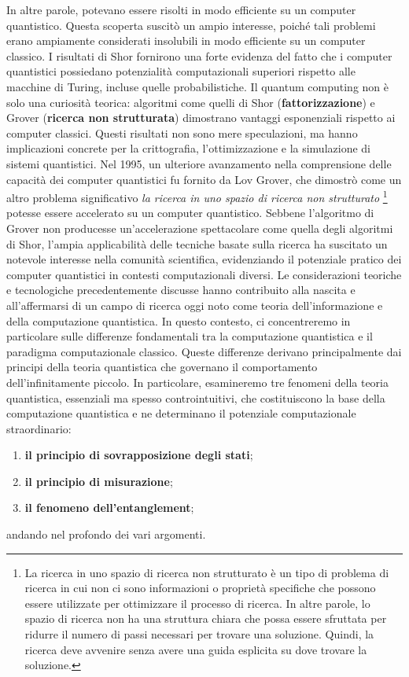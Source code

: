 \documentclass[a4paper,12pt]{report}
\theoremstyle{plain}
\begin{document}
In altre parole, potevano essere risolti in modo efficiente su un computer quantistico. Questa scoperta suscitò un ampio interesse, poiché tali problemi erano ampiamente considerati insolubili in modo efficiente su un computer classico. 
I risultati di Shor fornirono una forte evidenza del fatto che i computer quantistici possiedano potenzialità computazionali superiori rispetto alle macchine di Turing, incluse quelle probabilistiche. Il quantum computing non è solo una curiosità teorica: algoritmi come quelli di Shor (\textbf{fattorizzazione}) e Grover (\textbf{ricerca non strutturata}) dimostrano vantaggi esponenziali rispetto ai computer classici. 
Questi risultati non sono mere speculazioni, ma hanno implicazioni concrete per la crittografia, l'ottimizzazione e la simulazione di sistemi quantistici. 
Nel 1995, un ulteriore avanzamento nella comprensione delle capacità dei computer quantistici fu fornito da Lov Grover, che dimostrò come un altro problema significativo \textit{la ricerca in uno spazio di ricerca non strutturato} \footnote{La ricerca in uno spazio di ricerca non strutturato è un tipo di problema di ricerca in cui non ci sono informazioni o proprietà specifiche che possono essere utilizzate per ottimizzare il processo di ricerca. In altre parole, lo spazio di ricerca non ha una struttura chiara che possa essere sfruttata per ridurre il numero di passi necessari per trovare una soluzione. Quindi, la ricerca deve avvenire senza avere una guida esplicita su dove trovare la soluzione.} potesse essere accelerato su un computer quantistico. 
Sebbene l'algoritmo di Grover non producesse un'accelerazione spettacolare come quella degli algoritmi di Shor, l'ampia applicabilità delle tecniche basate sulla ricerca ha suscitato un notevole interesse nella comunità scientifica, evidenziando il potenziale pratico dei computer quantistici in contesti computazionali diversi. Le considerazioni teoriche e tecnologiche precedentemente discusse hanno contribuito alla nascita e all'affermarsi di un campo di ricerca oggi noto come teoria dell'informazione e della computazione quantistica. In questo contesto, ci concentreremo in particolare sulle differenze fondamentali tra la computazione quantistica e il paradigma computazionale classico. 
\newpage
\noindent Queste differenze derivano principalmente dai principi della teoria quantistica che governano il comportamento dell'infinitamente piccolo. In particolare, esamineremo tre fenomeni della teoria quantistica, essenziali ma spesso controintuitivi, che costituiscono la base della computazione quantistica e ne determinano il potenziale computazionale straordinario: 
\begin{enumerate}
  \item \textbf{il principio di sovrapposizione degli stati};
  \item \textbf{il principio di misurazione};
  \item \textbf{il fenomeno dell'entanglement};
\end{enumerate}
andando nel profondo dei vari argomenti.
\end{document}
